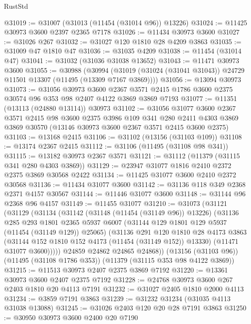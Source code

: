 \begin{lexlean}{RustStd}
\begin{coremodule}
@31019 := @31007 (@31013 (@11454 (@31014 @96)) @13226)
@31024 := @11425 @30973 @3600 @2397 @2365 @7178
@31026 := @11434 @30973 @3600
@31027 := @31026 @267
@31032 := @31027 @120 @1810 @28 @4209 @3863
@31035 := @31009 @47 @1810 @47
@31036 := @31035 @4209
@31038 := @11454 (@31014 @47)
@31041 := @31032 (@31036 @31038 @13652)
@31043 := @11471 @30973 @3600
@31055 := @30988
    (@30994 (@31019 (@31024 (@31041 @31043)) @24729 @11501 @13307 (@11495 (@13309 @7167 @3869))))
@31056 := @13094 @30973
@31073 := @31056
    @30973
    @3600
    @2367
    @3571
    @2415
    @1786
    @3600
    @2375
    @30574
    @96
    @353
    @98
    @2407
    @4122
    @3869
    @3869
    @7193
@31077 := @11351 (@13113 (@24880 @13114)) @30973
@31102 := @31056
    @31077
    @3600
    @2367
    @3571
    @2415
    @98
    @3600
    @2375
    @3986
    @109
    @341
    @280
    @2411
    @4303
    @3869
    @3869
    @30570
    (@13146 @30973 @3600 @2367 @3571 @2415 @3600 @2375)
@31103 := @13168 @2415
@31106 := @31102 (@13156 (@31103 @109))
@31108 := @13174 @2367 @2415
@31112 := @31106 (@11495 (@31108 @98 @341))
@31115 := @13182 @30973 @2367 @3571
@31121 := @31112 (@11379 (@31115 @341 @280 @4303 @3869))
@31129 := @23947 @31077 @1816 @2410 @2372 @2375 @3869 @30568 @2422
@31134 := @11425 @31077 @3600 @2410 @2372 @30568
@31136 := @11434 @31077 @3600
@31142 := @31136 @118 @349 @2368 @2371 @4157 @30567
@31144 := @11446 @31077 @3600
@31148 := @31144 @96 @2368 @96 @4157
@31149 := @11455 @31077
@31210 := @31073
    (@31121
      (@31129
        (@31134
          (@31142
            (@31148 (@11454 (@31149 @96)) @13226)
            (@31136
              @285
              @293
              @1801
              @2365
              @5937
              @6007
              (@31144 @129 @1801 @129 @5937 (@11454 (@31149 @129)) @25065)
              (@31136
                @291
                @120
                @1810
                @28
                @4173
                @3863
                (@31144 @152 @1810 @152 @4173 (@11454 (@31149 @152)) @13330)
                (@11471 @31077 @3600)))))
        @24859
        @24862
        @24865
        @24868))
    (@13156 (@31103 @96))
    (@11495 (@31108 @1786 @353))
    (@11379 (@31115 @353 @98 @4122 @3869))
@31215 := @11513 @30973 @2407 @2375 @3869 @7192
@31220 := @13361 @30973 @3600 @2407 @2375 @7192
@31228 := @24768 @30973 @3600 @267 @2403 @1810 @20 @4113 @7191
@31232 := @31027 @2405 @1810 @2000 @4113
@31234 := @3859 @7191 @3863
@31239 := @31232 @31234 (@31035 @4113 @31038 @13088)
@31245 := @31026 @2403 @120 @20 @28 @7191 @3863
@31250 := @30950 @30973 @3600 @2400 @20 @7190

\end{coremodule}
\end{lexlean}
